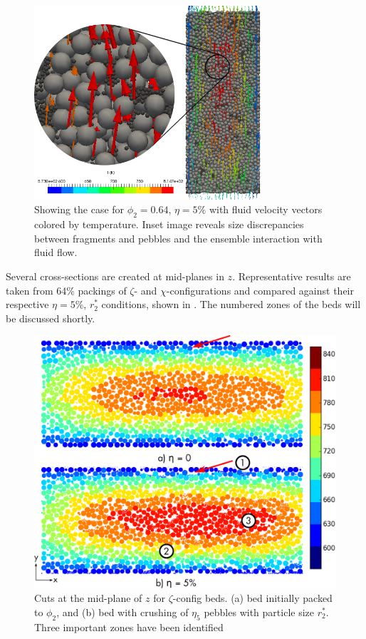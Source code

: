 \begin{figure}[ht]
    \centering
    \includegraphics[width = 0.75\textwidth]{figures/pebble_inset_2.png}
    \caption{Showing the case for $\phi_2 = 0.64$, $\eta = 5\%$ with fluid velocity vectors colored by temperature. Inset image reveals size discrepancies between fragments and pebbles and the ensemble interaction with fluid flow.}\label{fig:inset}
\end{figure}

Several cross-sections are created at mid-planes in $z$. Representative results are taken from 64\% packings of $\zeta$- and $\chi$-configurations and compared against their respective $\eta = 5\%$, $r_2^*$ conditions, shown in . The numbered zones of the beds will be discussed shortly.

\begin{figure}[!ht]
    \centering
    \includegraphics[width = \textwidth]{figures/z-64-discrete.eps}
    \caption{Cuts at the mid-plane of $z$ for $\zeta$-config beds. (a) bed initially packed to $\phi_2$, and (b) bed with crushing of $\eta_5$ pebbles with particle size $r_2^*$. Three important zones have been identified}\label{fig:1}
\end{figure}

